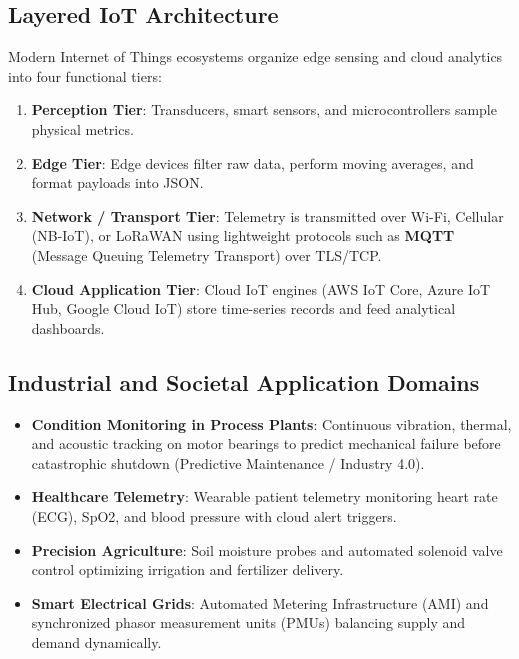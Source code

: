 \subsection{Layered IoT Architecture}
Modern Internet of Things ecosystems organize edge sensing and cloud analytics into four functional tiers:
\begin{enumerate}[leftmargin=1.5em]
    \item \textbf{Perception Tier}: Transducers, smart sensors, and microcontrollers sample physical metrics.
    \item \textbf{Edge Tier}: Edge devices filter raw data, perform moving averages, and format payloads into JSON.
    \item \textbf{Network / Transport Tier}: Telemetry is transmitted over Wi-Fi, Cellular (NB-IoT), or LoRaWAN using lightweight protocols such as \textbf{MQTT} (Message Queuing Telemetry Transport) over TLS/TCP.
    \item \textbf{Cloud Application Tier}: Cloud IoT engines (AWS IoT Core, Azure IoT Hub, Google Cloud IoT) store time-series records and feed analytical dashboards.
\end{enumerate}

\subsection{Industrial and Societal Application Domains}
\begin{itemize}[leftmargin=1.5em]
    \item \textbf{Condition Monitoring in Process Plants}: Continuous vibration, thermal, and acoustic tracking on motor bearings to predict mechanical failure before catastrophic shutdown (Predictive Maintenance / Industry 4.0).
    \item \textbf{Healthcare Telemetry}: Wearable patient telemetry monitoring heart rate (ECG), SpO2, and blood pressure with cloud alert triggers.
    \item \textbf{Precision Agriculture}: Soil moisture probes and automated solenoid valve control optimizing irrigation and fertilizer delivery.
    \item \textbf{Smart Electrical Grids}: Automated Metering Infrastructure (AMI) and synchronized phasor measurement units (PMUs) balancing supply and demand dynamically.
\end{itemize}

